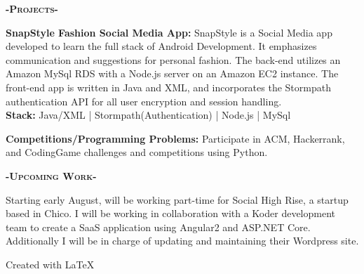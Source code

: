 \documentclass[12pt]{article}
\begin{document}
\begin{center}
\textbf{\textsc{-Projects-}}\\
\end{center}
\begin{footnotesize}

\flushleft
\color{Cerulean}\textbf{SnapStyle Fashion Social Media App:} 
\color{Black}SnapStyle is a Social Media app developed to learn the full stack of Android Development. It emphasizes communication and suggestions for personal fashion. The back-end utilizes an \color{TealBlue}Amazon MySql RDS \color{Black}with a \color{TealBlue}Node.js \color{Black} server on an \color{TealBlue}Amazon EC2 \color{Black}instance. The front-end app is written in \color{TealBlue}Java and XML, \color{Black} and incorporates the \color{TealBlue}Stormpath \color{Black}authentication API for all user encryption and session handling.\\
\smallskip
\setlength\parindent{24pt}\textbf{Stack:} \color{TealBlue} Java/XML | Stormpath(Authentication) | Node.js | MySql
\bigskip

\setlength\parindent{0pt}
\color{Cerulean}\textbf{Competitions/Programming Problems:}
\color{Black}Participate in ACM, Hackerrank, and CodingGame challenges and competitions using \color{TealBlue}Python.\color{Black}

\smallskip
\begin{center}
\textbf{\textsc{-Upcoming Work-}}\\
\end{center}

\color{black}Starting early August, will be working part-time for Social High Rise, a startup based in Chico. I will be working in collaboration with a \color{TealBlue}Koder \color{black} development team to create a SaaS application using \color{TealBlue}Angular2 \color{black}and \color{TealBlue}ASP.NET Core\color{black}. Additionally I will be in charge of updating and maintaining their \color{TealBlue}Wordpress \color{black} site.

\end{footnotesize}

\center
Created with \LaTeX
\end{document}
